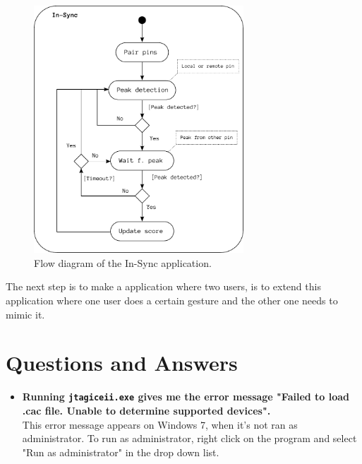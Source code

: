 \documentclass[a4paper, twoside, final]{book}%
\begin{document}
\begin{figure}[H]
  \centering
    \includegraphics[width=0.7\textwidth]{figures/insync_diagram.pdf}
  \caption{Flow diagram of the In-Sync application.}
  \label{fig:insync_diagram}
\end{figure}

The next step is to make a application where two users, is to extend this application where one user
does a certain gesture and the other one needs to mimic it.

\chapter{Questions and Answers}
\begin{itemize}
  \item {\bf Running {\tt jtagiceii.exe} gives me the error message "Failed to load .cac file. Unable to determine supported devices".}\\
  This error message appears on Windows 7, when it's not ran as administrator. To run as administrator, right click on the program and select "Run as administrator" in the drop down list.
\end{itemize}
\end{document}

